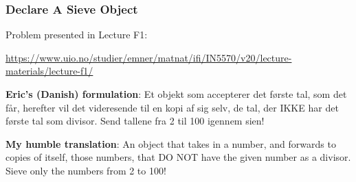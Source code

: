 \begin{frame}

\frametitle{Declare A Sieve Object}

\vspace{\fill}

Problem presented in Lecture F1:

\url{https://www.uio.no/studier/emner/matnat/ifi/IN5570/v20/lecture-materials/lecture-f1/}

\vspace{\fill}

\textbf{Eric's (Danish) formulation}: Et objekt som accepterer det
første tal, som det får, herefter vil det videresende til en kopi af
sig selv, de tal, der IKKE har det første tal som divisor. Send
tallene fra 2 til 100 igennem sien!

\vspace{\fill}

\textbf{My humble translation}: An object that takes in a number, and
forwards to copies of itself, those numbers, that DO NOT have the
given number as a divisor. Sieve only the numbers from 2 to 100!

\vspace{\fill}

\end{frame}
